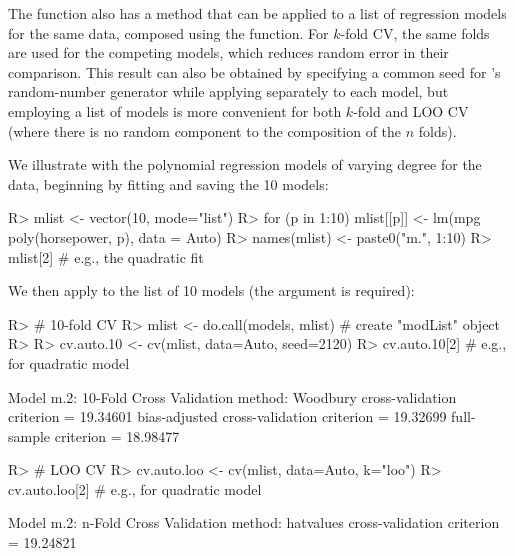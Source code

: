\documentclass[
]{jss}
\begin{document}
The  function also has a method that can be applied to a list
of regression models for the same data, composed using the
 function. For \(k\)-fold CV, the same folds are used for
the competing models, which reduces random error in their comparison.
This result can also be obtained by specifying a common seed for
's random-number generator while applying 
separately to each model, but employing a list of models is more
convenient for both \(k\)-fold and LOO CV (where there is no random
component to the composition of the \(n\) folds).

We illustrate with the polynomial regression models of varying degree
for the  data, beginning by fitting and saving the 10 models:

\begin{CodeChunk}
\begin{CodeInput}
R> mlist <- vector(10, mode="list")
R> for (p in 1:10) mlist[[p]] <- lm(mpg ~ poly(horsepower, p), data = Auto)
R> names(mlist) <- paste0("m.", 1:10)
R> mlist[2] # e.g., the quadratic fit
\end{CodeInput}
\end{CodeChunk}

We then apply  to the list of 10 models (the 
argument is required):

\begin{CodeChunk}
\begin{CodeInput}
R> # 10-fold CV
R> mlist <- do.call(models, mlist) # create "modList" object
R> 
R> cv.auto.10 <- cv(mlist, data=Auto, seed=2120)
R> cv.auto.10[2] # e.g., for quadratic model
\end{CodeInput}
\begin{CodeOutput}

Model m.2:
10-Fold Cross Validation
method: Woodbury
cross-validation criterion = 19.34601
bias-adjusted cross-validation criterion = 19.32699
full-sample criterion = 18.98477 
\end{CodeOutput}
\begin{CodeInput}
R> # LOO CV
R> cv.auto.loo <- cv(mlist, data=Auto, k="loo")
R> cv.auto.loo[2] # e.g., for quadratic model
\end{CodeInput}
\begin{CodeOutput}

Model m.2:
n-Fold Cross Validation
method: hatvalues
cross-validation criterion = 19.24821
\end{CodeOutput}
\end{CodeChunk}
\end{document}
